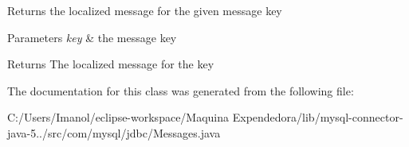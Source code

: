 Returns the localized message for the given message key


\begin{DoxyParams}{Parameters}
{\em key} & the message key \\
\hline
\end{DoxyParams}
\begin{DoxyReturn}{Returns}
The localized message for the key 
\end{DoxyReturn}


The documentation for this class was generated from the following file\+:\begin{DoxyCompactItemize}
\item 
C\+:/\+Users/\+Imanol/eclipse-\/workspace/\+Maquina Expendedora/lib/mysql-\/connector-\/java-\/5../src/com/mysql/jdbc/Messages.\+java\end{DoxyCompactItemize}
